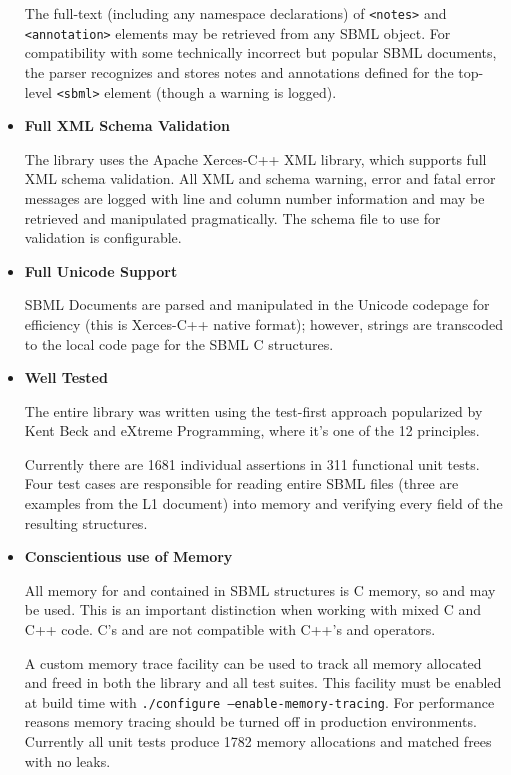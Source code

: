 \documentclass{cekmanual}
\begin{document}
\begin{itemize}
  The full-text (including any namespace declarations) of
  \texttt{<notes>} and \texttt{<annotation>} elements may be retrieved
  from any SBML object.  For compatibility with some technically
  incorrect but popular SBML documents, the parser recognizes and
  stores notes and annotations defined for the top-level
  \texttt{<sbml>} element (though a warning is logged).

  \item \textbf{Full XML Schema Validation}

  The library uses the Apache Xerces-C++ XML library, which supports
  full XML schema validation.  All XML and schema warning, error and
  fatal error messages are logged with line and column number
  information and may be retrieved and manipulated pragmatically.  The
  schema file to use for validation is configurable.

  \item \textbf{Full Unicode Support}

  SBML Documents are parsed and manipulated in the Unicode codepage
  for efficiency (this is Xerces-C++ native format); however, strings
  are transcoded to the local code page for the SBML C structures.

  \item \textbf{Well Tested}

  The entire library was written using the test-first approach
  popularized by Kent Beck and eXtreme Programming, where it's one of
  the 12 principles.

  Currently there are 1681 individual assertions in 311 functional
  unit tests.  Four test cases are responsible for reading entire SBML
  files (three are examples from the L1 document) into memory and
  verifying every field of the resulting structures.

  \item \textbf{Conscientious use of Memory}

  All memory for and contained in SBML structures is C memory, so
   and  may be used.  This is an
  important distinction when working with mixed C and C++ code.  C's
   and  are not compatible with C++'s
   and  operators.

  A custom memory trace facility can be used to track all memory
  allocated and freed in both the library and all test suites.  This
  facility must be enabled at build time with \texttt{./configure
  --enable-memory-tracing}.  For performance reasons memory tracing
  should be turned off in production environments.  Currently all unit
  tests produce 1782 memory allocations and matched frees with no
  leaks.

\end{itemize}
\end{document}
